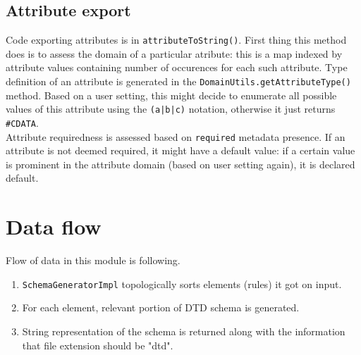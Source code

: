 \documentclass[a4paper,10pt,oneside]{article}
\newcommand{\code}[1]{\texttt{#1}}
\begin{document}
\subsection{Attribute export}

Code exporting attributes is in \code{attributeToString()}. First thing this method does is to assess the domain of a particular atribute: this is a map indexed by attribute values containing number of occurences for each such attribute. Type definition of an attribute is generated in the \code{DomainUtils.getAttributeType()} method. Based on a user setting, this might decide to enumerate all possible values of this attribute using the \code{(a|b|c)} notation, otherwise it just returns \code{\#CDATA}.\\
Attribute requiredness is assessed based on \code{required} metadata presence. If an attribute is not deemed required, it might have a default value: if a certain value is prominent in the attribute domain (based on user setting again), it is declared default.

\section{Data flow}

Flow of data in this module is following.
\begin{enumerate}
	\item \code{SchemaGeneratorImpl} topologically sorts elements (rules) it got on input.
	\item For each element, relevant portion of DTD schema is generated.
	\item String representation of the schema is returned along with the information that file extension should be "dtd".
\end{enumerate}

\newpage


\end{document}
